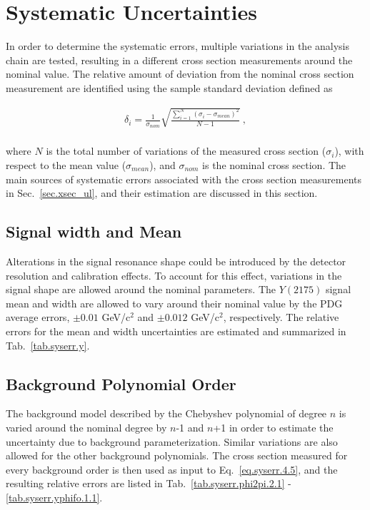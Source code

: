 \section{Systematic Uncertainties}
\label{sec.syserr}

In order to determine the systematic errors, multiple variations in the analysis chain are tested, resulting in a different cross section measurements around the nominal value. The relative amount of deviation from the nominal cross section measurement are identified using the sample standard deviation defined as

\begin{equation}
    \label{eq.syserr.4.5}
    \begin{aligned}
        \delta_{i} = \frac{1}{\sigma_{nom}} \sqrt{\frac{\sum\limits_{i=1}^{N} (\sigma_{i} - \sigma_{mean})^2}{N-1}}~,\\
    \end{aligned}
\end{equation}

\noindent where $N$ is the total number of variations of the measured cross section ($\sigma_{i}$), with respect to the mean value ($\sigma_{mean}$), and $\sigma_{nom}$ is the nominal cross section. The main sources of systematic errors associated with the cross section measurements in Sec.~\ref{sec.xsec_ul}, and their estimation are discussed in this section.

\subsection{Signal width and Mean}
\label{sec.syserr.sig}

Alterations in the signal resonance shape could be introduced by the detector resolution and calibration effects. To account for this effect, variations in the signal shape are allowed around the nominal parameters. The $Y(2175)$ signal mean and width are allowed to vary around their nominal value by the PDG average errors, $\pm 0.01$ GeV/c$^2$ and $\pm 0.012$ GeV/c$^2$, respectively. The relative errors for the mean and width uncertainties are estimated and summarized in Tab.~\ref{tab.syserr.y}.

\subsection{Background Polynomial Order}
\label{sec.syserr.bkg}

The background model described by the Chebyshev polynomial of degree $n$ is varied around the nominal degree by $n$-1 and $n$+1 in order to estimate the uncertainty due to background parameterization. Similar variations are also allowed for the other background polynomials. The cross section measured for every background order is then used as input to Eq.~\ref{eq.syserr.4.5}, and the resulting relative errors are listed in Tab.~\ref{tab.syserr.phi2pi.2.1} - \ref{tab.syserr.yphifo.1.1}.

